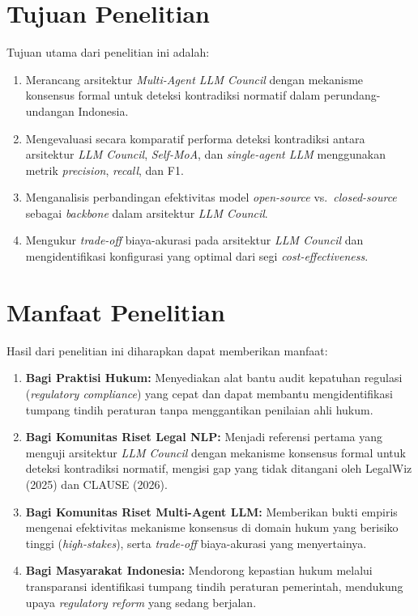 \section{Tujuan Penelitian}
Tujuan utama dari penelitian ini adalah:
\begin{enumerate}
	\item Merancang arsitektur \textit{Multi-Agent LLM Council} dengan mekanisme konsensus formal untuk deteksi kontradiksi normatif dalam perundang-undangan Indonesia.
	\item Mengevaluasi secara komparatif performa deteksi kontradiksi antara arsitektur \textit{LLM Council}, \textit{Self-MoA}, dan \textit{single-agent LLM} menggunakan metrik \textit{precision}, \textit{recall}, dan F1.
	\item Menganalisis perbandingan efektivitas model \textit{open-source} vs.\ \textit{closed-source} sebagai \textit{backbone} dalam arsitektur \textit{LLM Council}.
	\item Mengukur \textit{trade-off} biaya-akurasi pada arsitektur \textit{LLM Council} dan mengidentifikasi konfigurasi yang optimal dari segi \textit{cost-effectiveness}.
\end{enumerate}

\section{Manfaat Penelitian}
Hasil dari penelitian ini diharapkan dapat memberikan manfaat:
\begin{enumerate}
	\item \textbf{Bagi Praktisi Hukum:} Menyediakan alat bantu audit kepatuhan regulasi (\textit{regulatory compliance}) yang cepat dan dapat membantu mengidentifikasi tumpang tindih peraturan tanpa menggantikan penilaian ahli hukum.
	\item \textbf{Bagi Komunitas Riset Legal NLP:} Menjadi referensi pertama yang menguji arsitektur \textit{LLM Council} dengan mekanisme konsensus formal untuk deteksi kontradiksi normatif, mengisi gap yang tidak ditangani oleh LegalWiz (2025) dan CLAUSE (2026).
	\item \textbf{Bagi Komunitas Riset Multi-Agent LLM:} Memberikan bukti empiris mengenai efektivitas mekanisme konsensus di domain hukum yang berisiko tinggi (\textit{high-stakes}), serta \textit{trade-off} biaya-akurasi yang menyertainya.
	\item \textbf{Bagi Masyarakat Indonesia:} Mendorong kepastian hukum melalui transparansi identifikasi tumpang tindih peraturan pemerintah, mendukung upaya \textit{regulatory reform} yang sedang berjalan.
\end{enumerate}